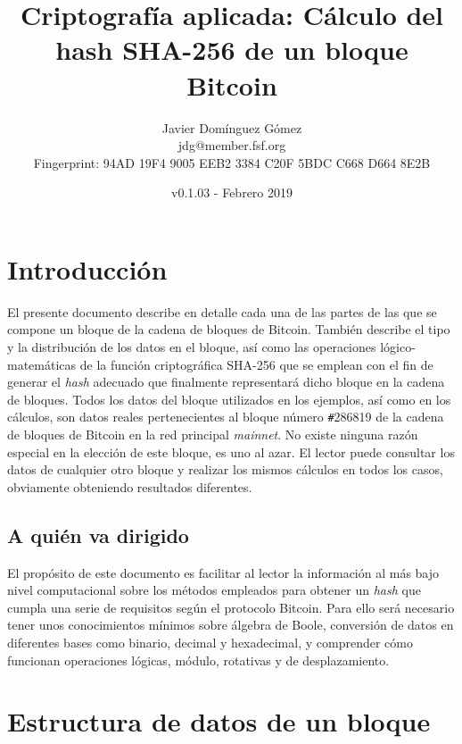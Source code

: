 \documentclass{article}
\title{\textbf{Criptografía aplicada: Cálculo del hash SHA-256 de un bloque Bitcoin}}
\author{Javier Domínguez Gómez \\
\small{jdg@member.fsf.org} \\
\small{Fingerprint: 94AD 19F4 9005 EEB2 3384 C20F 5BDC C668 D664 8E2B}}
\date{v0.1.03 - Febrero 2019}
\begin{document}
\maketitle

\tableofcontents{}

\section{Introducción}
    El presente documento describe en detalle cada una de las partes de las que se compone un bloque de la cadena de bloques de Bitcoin. También describe el tipo y la distribución de los datos en el bloque, así como las operaciones lógico-matemáticas de la función criptográfica SHA-256 que se emplean con el fin de generar el \textit{hash} adecuado que finalmente representará dicho bloque en la cadena de bloques. Todos los datos del bloque utilizados en los ejemplos, así como en los cálculos, son datos reales pertenecientes al bloque número \texttt{\#}286819 de la cadena de bloques de Bitcoin en la red principal \textit{mainnet}. No existe ninguna razón especial en la elección de este bloque, es uno al azar. El lector puede consultar los datos de cualquier otro bloque y realizar los mismos cálculos en todos los casos, obviamente obteniendo resultados diferentes.
    
    \subsection{A quién va dirigido}
    El propósito de este documento es facilitar al lector la información al más bajo nivel computacional sobre los métodos empleados para obtener un \textit{hash} que cumpla una serie de requisitos según el protocolo Bitcoin. Para ello será necesario tener unos conocimientos mínimos sobre álgebra de Boole, conversión de datos en diferentes bases como binario, decimal y hexadecimal, y comprender cómo funcionan operaciones lógicas, módulo, rotativas y de desplazamiento.

\section{Estructura de datos de un bloque}
    
    \vspace{3mm}
    
\end{document}
